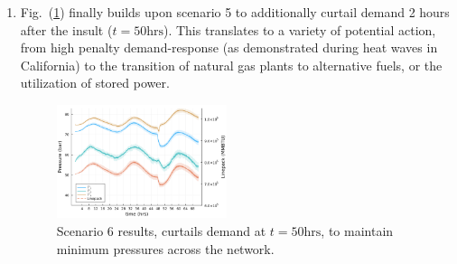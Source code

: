\begin{enumerate}
    \item Fig.~(\ref{fig:scen6}) finally builds upon scenario 5 to additionally curtail demand 2 hours after the insult ($t=50\text{hrs}$). This translates to a variety of potential action, from high penalty demand-response (as demonstrated during heat waves in California) to the transition of natural gas plants to alternative fuels, or the utilization of stored power. %
    \begin{figure}
    \centering
    \includegraphics[width=0.47\textwidth]{figs/ScenarioResults/scen6.png}
    \caption{Scenario 6 results, curtails demand at $t=50\text{hrs}$, to maintain minimum pressures across the network.}
    \label{fig:scen6}
\end{figure}

\end{enumerate}

